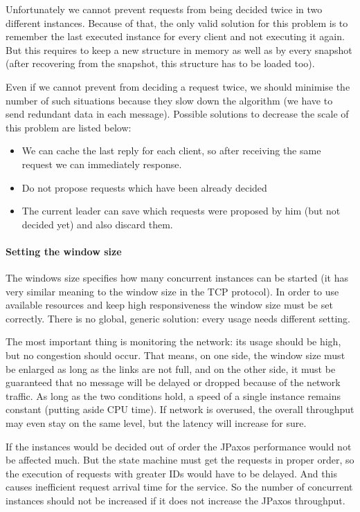 Unfortunately we cannot prevent requests from being decided twice in two different instances. Because of that, the only valid solution for this problem is to remember the last executed instance for every client and not executing it again. But this requires to keep a new structure in memory as well as by every snapshot (after recovering from the snapshot, this structure has to be loaded too).

Even if we cannot prevent from deciding a request twice, we should minimise the number of such situations because they slow down the algorithm (we have to send redundant data in each message). Possible solutions to decrease the scale of this problem are listed below:
\begin{itemize}
  \item We can cache the last reply for each client, so after receiving the same request we can immediately response.
  \item Do not propose requests which have been already decided
  \item The current leader can save which requests were proposed by him (but not decided yet) and also discard them.
\end{itemize}

\paragraph{Setting the window size}
The windows size specifies how many concurrent instances can be started (it has very similar meaning to the window size in the TCP protocol). In order to use available resources and keep high responsiveness the window size must be set correctly. There is no global, generic solution: every usage needs different setting.

The most important thing is monitoring the network: its usage should be high, but no congestion should occur.
That means, on one side, the window size must be enlarged as long as the links are not full, and on the other side, it must be guaranteed that no message will be delayed or dropped because of the network traffic. As long as the two conditions hold, a speed of a single instance remains constant (putting aside CPU time).
If network is overused, the overall throughput may even stay on the same level, but the latency will increase for sure.

If the instances would be decided out of order the JPaxos performance would not be affected much. But the state machine must get the requests in proper order, so the execution of requests with greater IDs would have to be delayed. And this causes inefficient request arrival time for the service. So the number of concurrent instances should not be increased if it does not increase the JPaxos throughput.

